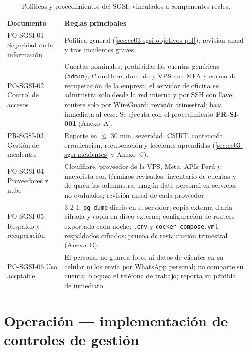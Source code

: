 \begin{table}[H]
\centering
\caption{Políticas y procedimientos del SGSI, vinculados a componentes reales.}
\label{tab:ce03-sgsi-politicas-tab}
\small
\begin{tabularx}{\textwidth}{L{3cm}X}
\toprule
\textbf{Documento} & \textbf{Reglas principales} \\
\midrule
PO-SGSI-01 Seguridad de la información & Política general (\cref{sec:ce03-sgsi-objetivos-pol}); revisión anual y tras incidentes graves. \\
PO-SGSI-02 Control de accesos & Cuentas nominales; prohibidas las cuentas genéricas (\texttt{admin}); Cloudflare, dominio y VPS con MFA y correo de recuperación de la empresa; el servidor de oficina se administra solo desde la red interna y por SSH con llave; routers solo por WireGuard; revisión trimestral; baja inmediata al cese. Se ejecuta con el procedimiento \textbf{PR-SI-001} (Anexo~A). \\
PR-SGSI-03 Gestión de incidentes & Reporte en $\leq$ 30 min, severidad, CSIRT, contención, erradicación, recuperación y lecciones aprendidas (\cref{sec:ce03-sgsi-incidentes} y Anexo~C). \\
PO-SGSI-04 Proveedores y nube & Cloudflare, proveedor de la VPS, Meta, APIs Perú y mayorista con términos revisados; inventario de cuentas y de quién las administra; ningún dato personal en servicios no evaluados; revisión anual de cada proveedor. \\
PO-SGSI-05 Respaldo y recuperación & 3-2-1: \texttt{pg\_dump} diario en el servidor, copia externa diaria cifrada y copia en disco externo; configuración de routers exportada cada noche; \texttt{.env} y \texttt{docker-compose.yml} respaldados cifrados; prueba de restauración trimestral (Anexo~D). \\
PO-SGSI-06 Uso aceptable & El personal no guarda fotos ni datos de clientes en su celular ni los envía por WhatsApp personal; no comparte su cuenta; bloquea el teléfono de trabajo; reporta su pérdida de inmediato. \\
\bottomrule
\end{tabularx}
\end{table}

\section{Operación --- implementación de controles de gestión}

